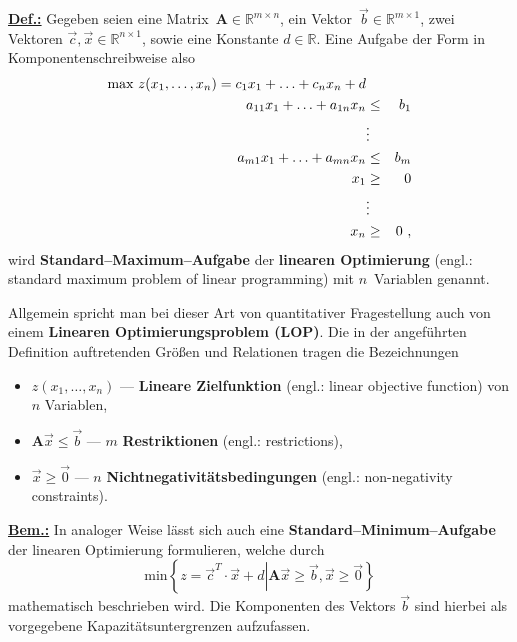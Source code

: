\medskip
\noindent
\underline{\bf Def.:}
Gegeben seien eine Matrix~$\mathbf{A} \in
\mathbb{R}^{m \times n}$, ein Vektor~$\vec{b} \in
\mathbb{R}^{m \times 1}$, zwei Vektoren $\vec{c},\vec{x} \in
\mathbb{R}^{n \times 1}$, sowie eine Konstante
$d \in \mathbb{R}$. Eine Aufgabe der Form
%
\be
{}
\ee
%
in Komponentenschreibweise also
%
\begin{eqnarray}
\lb{lops1}
\text{max}\ z(x_{1},\ldots,x_{n})
= c_{1}x_{1} + \ldots + c_{n}x_{n} + d & & \\
a_{11}x_{1}+\ldots+a_{1n}x_{n} & \leq & b_{1} \\
%
 & \vdots & \nonumber \\
%
a_{m1}x_{1}+\ldots+a_{mn}x_{n} & \leq & b_{m} \\
%
x_{1} & \geq & 0 \\
%
 & \vdots & \nonumber \\
%
\lb{lopsm1}
x_{n} & \geq & 0 \ ,
\end{eqnarray}
%
wird {\bf Standard--Maximum--Aufgabe} der
{\bf linearen Optimierung} (engl.: standard maximum problem of 
linear programming) mit $n$~Variablen genannt.

\medskip
\noindent
Allgemein spricht man bei dieser Art von quantitativer
Fragestellung auch von einem {\bf Linearen Optimierungsproblem
(LOP)}. Die in der angef\"uhrten Definition auftretenden
Gr\"o\ss en und Relationen tragen die Bezeichnungen

\begin{itemize}

\item $z(x_{1},\ldots,x_{n})$ ---
{\bf Lineare Zielfunktion} (engl.: linear objective function) von 
$n$ Variablen,

\item $\mathbf{A}\vec{x} \leq \vec{b}$ ---
$m$ {\bf Restriktionen} (engl.: restrictions),

\item $\vec{x} \geq \vec{0}$ ---
$n$ {\bf Nichtnegativit\"atsbedingungen} (engl.: non-negativity 
constraints).

\end{itemize}

\noindent
\underline{\bf Bem.:} In %
analoger Weise  l\"asst sich auch eine
{\bf Standard--Minimum--Aufgabe} der
linearen Optimierung formulieren, welche durch
%
\[
\text{min}\left\{z=\vec{c}^{T}\cdot\vec{x}
+d\left|\mathbf{A}\vec{x}
\geq \vec{b}, \vec{x} \geq \vec{0}\right.\right\}
\]
%
mathematisch beschrieben wird. Die Komponenten
des Vektors $\vec{b}$ sind hierbei
als vorgegebene Kapazit\"atsuntergrenzen aufzufassen.

